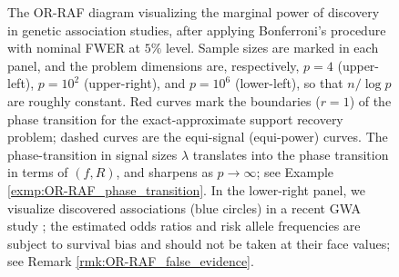 \begin{figure}
      \caption{The OR-RAF diagram visualizing the marginal power of discovery in genetic association studies, after applying Bonferroni's procedure with nominal FWER at $5\%$ level. 
      Sample sizes are marked in each panel, and the problem dimensions are, respectively, $p=4$ (upper-left), $p=10^2$ (upper-right), and $p=10^6$ (lower-left), so that $n/\log{p}$ are roughly constant.
      Red curves mark the boundaries ($r=1$) of the phase transition for the exact-approximate support recovery problem; dashed curves are the equi-signal (equi-power) curves.
      The phase-transition in signal sizes $\lambda$ translates into the phase transition in terms of $(f,R)$, and sharpens as $p\to\infty$; see Example \ref{exmp:OR-RAF_phase_transition}.
      In the lower-right panel, we visualize discovered associations (blue circles) in a recent GWA study \cite{michailidou2017association}; the estimated odds ratios and risk allele frequencies are subject to survival bias and should not be taken at their face values; see Remark \ref{rmk:OR-RAF_false_evidence}.} 
      \label{fig:OR-RAF_GWAS}
\end{figure}


